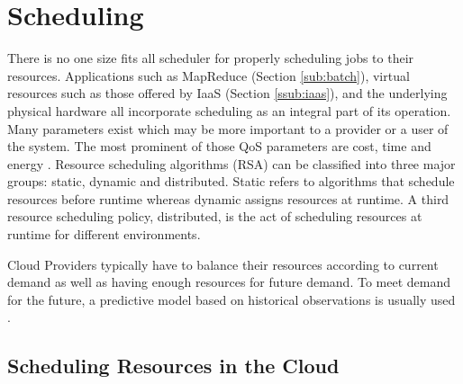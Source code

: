 \documentclass[12pt]{article}
\begin{document}





\section{Scheduling} \label{sec:scheduling}











There is no one size fits all scheduler for properly scheduling jobs to their resources. Applications such as MapReduce (Section \ref{sub:batch}), virtual resources such as those offered by IaaS (Section \ref{ssub:iaas}), and the underlying physical hardware all incorporate scheduling as an integral part of its operation. Many parameters exist which may be more important to a provider or a user of the system. The most prominent of those QoS parameters are cost, time and energy \cite{Singh2016}. Resource scheduling algorithms (RSA) can be classified into three major groups: static, dynamic and distributed. Static refers to algorithms that schedule resources before runtime whereas dynamic assigns resources at runtime. A third resource scheduling policy, distributed, is the act of scheduling resources at runtime for different environments.


Cloud Providers typically have to balance their resources according to current demand as well as having enough resources for future demand. To meet demand for the future, a predictive model based on historical observations is usually used \cite{Jennings2015}.



\subsection{Scheduling Resources in the Cloud}
\end{document}
